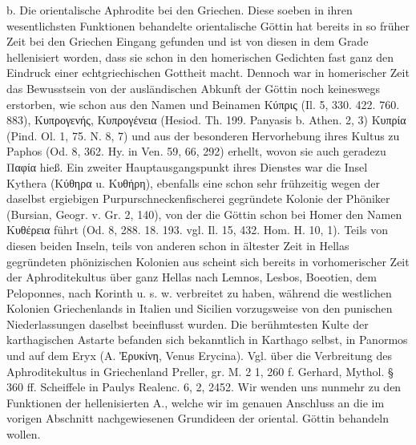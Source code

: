 \documentclass[a4paper, 11pt, oneside]{article}
\begin{document}
b. Die orientalische Aphrodite bei den Griechen. Diese soeben in ihren wesentlichsten Funktionen behandelte orientalische Göttin hat bereits in so früher Zeit bei den Griechen Eingang gefunden und ist von diesen in dem Grade hellenisiert worden, dass sie schon in den homerischen Gedichten fast ganz den Eindruck einer echtgriechischen Gottheit macht. Dennoch war in homerischer Zeit das Bewusstsein von der ausländischen Abkunft der Göttin noch keineswegs erstorben, wie schon aus den Namen und Beinamen Κύπρις (Il. 5, 330. 422. 760. 883), Κυπρογενής, Κυπρογένεια (Hesiod. Th. 199. Panyasis b. Athen. 2, 3) Κυπρία (Pind. Ol. 1, 75. N. 8, 7) und aus der besonderen Hervorhebung ihres Kultus zu Paphos (Od. 8, 362. Hy. in Ven. 59, 66, 292) erhellt, wovon sie auch geradezu Παφία hieß. Ein zweiter Hauptausgangspunkt ihres Dienstes war die Insel Kythera (Κύθηρα u. Κυθήρη), ebenfalls eine schon sehr frühzeitig wegen der daselbst ergiebigen Purpurschneckenfischerei gegründete Kolonie der Phöniker (Bursian, Geogr. v. Gr. 2, 140), von der die Göttin schon bei Homer den Namen Κυθέρεια führt (Od. 8, 288. 18. 193. vgl. Il. 15, 432. Hom. H. 10, 1). Teils von diesen beiden Inseln, teils von anderen schon in ältester Zeit in Hellas gegründeten phönizischen Kolonien aus scheint sich bereits in vorhomerischer Zeit der Aphroditekultus über ganz Hellas nach Lemnos, Lesbos, Boeotien, dem Peloponnes, nach Korinth u. s. w. verbreitet zu haben, während die westlichen Kolonien Griechenlands in Italien und Sicilien vorzugsweise von den punischen Niederlassungen daselbst beeinflusst wurden. Die berühmtesten Kulte der karthagischen Astarte befanden sich bekanntlich in Karthago selbst, in Panormos und auf dem Eryx (A. Ἐρυκίνη, Venus Erycina). Vgl. über die Verbreitung des Aphroditekultus in Griechenland Preller, gr. M. 2 1, 260 f. Gerhard, Mythol. § 360 ff. Scheiffele in Paulys Realenc. 6, 2, 2452. Wir wenden uns nunmehr zu den Funktionen der hellenisierten A., welche wir im genauen Anschluss an die im vorigen Abschnitt nachgewiesenen Grundideen der oriental. Göttin behandeln wollen.
\end{document}
